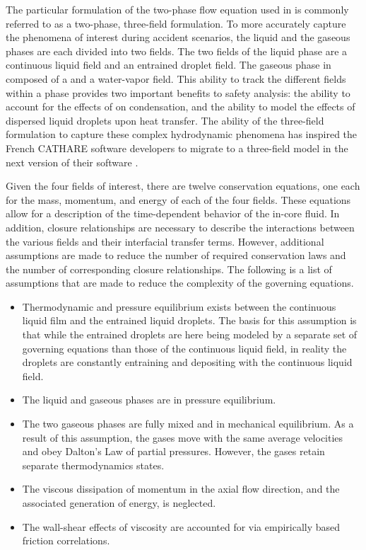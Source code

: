 The particular formulation of the two-phase flow equation used in \cobra{} is commonly referred to as a two-phase, three-field formulation.
To more accurately capture the phenomena of interest during accident scenarios, the liquid and the gaseous phases are each divided into two fields.
The two fields of the liquid phase are a continuous liquid field and an entrained droplet field.
The gaseous phase in composed of a \ncg{} and a water-vapor field. 
This ability to track the different fields within a phase provides two important benefits to safety analysis: the ability to account for the effects of \ncgs{} on condensation, and the ability to model the effects of dispersed liquid droplets  upon heat transfer.
The ability of the three-field formulation to capture these complex hydrodynamic phenomena has inspired the French CATHARE software developers to migrate to a three-field model in the next version of their software \cite{Emonot2011}.

Given the four fields of interest, there are twelve conservation equations, one each for the mass, momentum, and energy of each of the four fields.
These equations allow for a description of the time-dependent behavior of the in-core fluid.
In addition, closure relationships are necessary to describe the interactions between the various fields and their interfacial transfer terms.
However, additional assumptions are made to reduce the number of required conservation laws and the number of corresponding closure relationships.
The following is a list of assumptions that are made to reduce the complexity of the governing equations.

\begin{itemize}
\item{
Thermodynamic and pressure equilibrium exists between the continuous liquid film and the entrained liquid droplets.
The basis for this assumption is that while the entrained droplets are here being modeled by a separate set of governing equations than those of the continuous liquid field, in reality the droplets are constantly entraining and depositing with the continuous liquid field. 
}
\item{
The liquid and gaseous phases are in pressure equilibrium.
}
\item{
The two gaseous phases are fully mixed and in mechanical equilibrium.
As a result of this assumption, the gases move with the same average velocities and obey Dalton's Law of partial pressures.
However, the gases retain separate thermodynamics states.
}
\item{
The viscous dissipation of momentum in the axial flow direction, and the associated generation of energy, is neglected.
}
\item{
The wall-shear effects of viscosity are accounted for via empirically based friction correlations.
}
\end{itemize}

